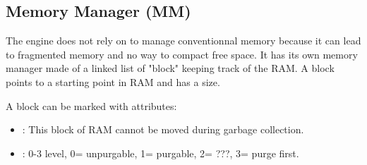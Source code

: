 \documentclass[book.tex]{subfiles}
\begin{document}
\subsection{Memory Manager (MM)}
The engine does not rely on  to manage conventionnal memory because it can lead to fragmented memory and no way to compact free space. It has its own memory manager made of a linked list of "block" keeping track of the RAM. A block points to a starting point in RAM and has a size.\\
 \par

 \par
A block can be marked with attributes:
\begin{itemize}
\item {} : This block of RAM cannot be moved during garbage collection.
\item {} : 0-3 level, 0= unpurgable, 1= purgable, 2= ???, 3= purge first.
\end{itemize}
\end{document}
